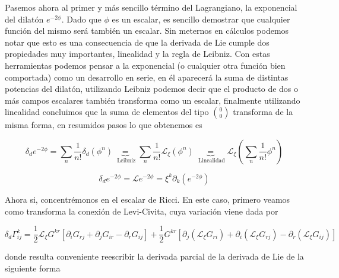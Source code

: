 \documentclass{article}
\numberwithin{equation}{section}
\begin{document}
Pasemos ahora al primer y más sencillo término del Lagrangiano, la exponencial del dilatón $ e^{-2\phi} $. Dado que $ \phi $ es un escalar, es sencillo demostrar que cualquier función del mismo será también un escalar. Sin meternos en cálculos podemos notar que esto es una consecuencia de que la derivada de Lie cumple dos propiedades muy importantes, linealidad y la regla de Leibniz. Con estas herramientas podemos pensar a la exponencial (o cualquier otra función bien comportada) como un desarrollo en serie, en él aparecerá la suma de distintas potencias del dilatón, utilizando Leibniz podemos decir que el producto de dos o más campos escalares también transforma como un escalar, finalmente utilizando linealidad concluimos que la suma de elementos del tipo $ \binom{0}{0} $ transforma de la misma forma, en resumidos pasos lo que obtenemos es

\begin{equation*}
\delta_d e^{-2 \phi} = \sum_n \frac{1}{n!} \delta_d ( \phi^n) \underbrace{=}_{\text{ Leibniz}} \sum_n \frac{1}{n!} \mathcal{L}_{\xi} ( \phi^n)\underbrace{=}_{\text{ Linealidad}} \mathcal{L}_{\xi} \left( \sum_n \frac{1}{n!} \phi^n \right)
\end{equation*} 

\begin{boxquation}
	\begin{equation}\label{res2}
	\delta_d e^{-2 \phi} = \mathcal{L} e^{-2\phi} = \xi^k \partial_k \left(e^{-2\phi}\right)
	\end{equation}
\end{boxquation}

\vspace{0.6cm}



Ahora si, concentrémonos en el escalar de Ricci. En este caso, primero veamos como transforma la conexión de Levi-Civita, cuya variación viene dada por

\begin{equation}\label{gamadifeo}
\delta_d \Gamma^{k}_{i j} = \frac{1}{2}\mathcal{L}_{\xi} G^{k r}\left[ \partial_i G_{r j} + \partial_j G_{i r} - \partial_r G_{i j}\right] + \frac{1}{2} G^{k r}\left[ \partial_j \left(\mathcal{L}_{\xi} G_{r i}\right) + \partial_i \left(\mathcal{L}_{\xi} G_{r j}\right) - \partial_r \left(\mathcal{L}_{\xi}G_{ij}\right) \right]
\end{equation} 

donde resulta conveniente reescribir la derivada parcial de la derivada de Lie de la siguiente forma
\end{document}
